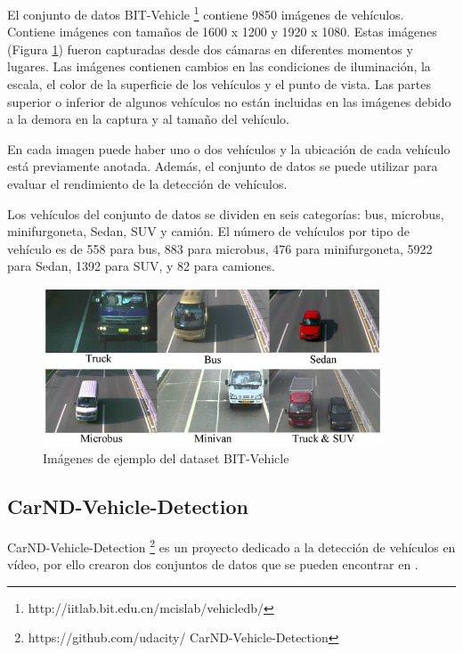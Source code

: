 El conjunto de datos BIT-Vehicle \footnote{http://iitlab.bit.edu.cn/mcislab/vehicledb/}\cite{bit} contiene 9850 imágenes de vehículos. Contiene imágenes con tamaños de 1600 x 1200 y 1920 x 1080. Estas imágenes (Figura \ref{fig.bit}) fueron capturadas desde dos cámaras en diferentes momentos y lugares. Las imágenes contienen cambios en las condiciones de iluminación, la escala, el color de la superficie de los vehículos y el punto de vista. Las partes superior o inferior de algunos vehículos no están incluidas en las imágenes debido a la demora en la captura y al tamaño del vehículo. 

En cada imagen puede haber uno o dos vehículos y la ubicación de cada vehículo está previamente anotada. Además, el conjunto de datos se puede utilizar para evaluar el rendimiento de la detección de vehículos.

Los vehículos del conjunto de datos se dividen en seis categorías: bus, microbus, minifurgoneta, Sedan, SUV y camión. El número de vehículos por tipo de vehículo es de 558 para bus, 883 para microbus, 476 para minifurgoneta, 5922 para Sedan, 1392 para SUV, y 82 para camiones.

\begin{figure}[H] 
\begin{center}
	\includegraphics[width=0.9\textwidth]{figures/Estado_arte/bit.png}
   \caption{Imágenes de ejemplo del dataset BIT-Vehicle}
	\label{fig.bit}
\end{center}
\end{figure}

\subsection{CarND-Vehicle-Detection}

CarND-Vehicle-Detection \footnote{https://github.com/udacity/
CarND-Vehicle-Detection}\cite{carnd1} es un proyecto dedicado a la detección de vehículos en vídeo, por ello crearon dos conjuntos de datos que se pueden encontrar en \cite{carnd2}.

